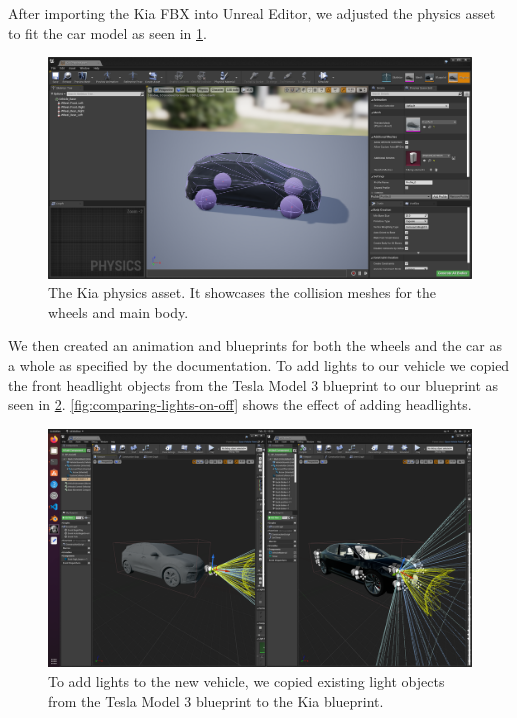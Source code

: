 After importing the Kia FBX into Unreal Editor, we adjusted the physics asset to fit the car model as seen in \cref{fig:ue-kia-physics}. 

\begin{figure}[h!]
    \centering
    \includegraphics[width=\textwidth]{chapters/3-method/figures/ue-kia-physics.png}
    \caption{The Kia physics asset. It showcases the collision meshes for the wheels and main body.}
    \label{fig:ue-kia-physics}
\end{figure}

We then created an animation and blueprints for both the wheels and the car as a whole as specified by the documentation. To add lights to our vehicle we copied the front headlight objects from the Tesla Model 3 blueprint to our blueprint as seen in \cref{fig:adding-lights}. \cref{fig:comparing-lights-on-off} shows the effect of adding headlights. 

\begin{figure}[h!]
    \centering
    \includegraphics[width=\textwidth]{chapters/3-method/figures/adding-lights.png}
    \caption{To add lights to the new vehicle, we copied existing light objects from the Tesla Model 3 blueprint to the Kia blueprint.}
    \label{fig:adding-lights}
\end{figure}

